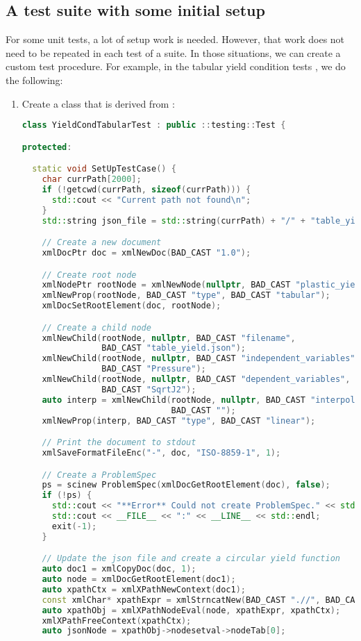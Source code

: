 \subsection{A  test suite with some initial setup}
For some unit tests, a lot of setup work is needed.  However, that work does not
need to be repeated in each test of a suite.  In those situations, we can 
create a custom  test procedure.  For example, in the 
tabular yield condition tests , we do the following:
\begin{enumerate}
  \item Create a class that is derived from :
\begin{lstlisting}[language=Cpp]
class YieldCondTabularTest : public ::testing::Test {

protected:

  static void SetUpTestCase() {
    char currPath[2000];
    if (!getcwd(currPath, sizeof(currPath))) {
      std::cout << "Current path not found\n";
    }
    std::string json_file = std::string(currPath) + "/" + "table_yield.json";

    // Create a new document
    xmlDocPtr doc = xmlNewDoc(BAD_CAST "1.0");

    // Create root node
    xmlNodePtr rootNode = xmlNewNode(nullptr, BAD_CAST "plastic_yield_condition");
    xmlNewProp(rootNode, BAD_CAST "type", BAD_CAST "tabular");
    xmlDocSetRootElement(doc, rootNode);

    // Create a child node
    xmlNewChild(rootNode, nullptr, BAD_CAST "filename", 
                BAD_CAST "table_yield.json");
    xmlNewChild(rootNode, nullptr, BAD_CAST "independent_variables", 
                BAD_CAST "Pressure");
    xmlNewChild(rootNode, nullptr, BAD_CAST "dependent_variables", 
                BAD_CAST "SqrtJ2");
    auto interp = xmlNewChild(rootNode, nullptr, BAD_CAST "interpolation",
                              BAD_CAST "");
    xmlNewProp(interp, BAD_CAST "type", BAD_CAST "linear");

    // Print the document to stdout
    xmlSaveFormatFileEnc("-", doc, "ISO-8859-1", 1);

    // Create a ProblemSpec
    ps = scinew ProblemSpec(xmlDocGetRootElement(doc), false);
    if (!ps) {
      std::cout << "**Error** Could not create ProblemSpec." << std::endl;
      std::cout << __FILE__ << ":" << __LINE__ << std::endl;
      exit(-1);
    }

    // Update the json file and create a circular yield function
    auto doc1 = xmlCopyDoc(doc, 1);
    auto node = xmlDocGetRootElement(doc1);
    auto xpathCtx = xmlXPathNewContext(doc1);
    const xmlChar* xpathExpr = xmlStrncatNew(BAD_CAST ".//", BAD_CAST "filename", -1);
    auto xpathObj = xmlXPathNodeEval(node, xpathExpr, xpathCtx);
    xmlXPathFreeContext(xpathCtx);
    auto jsonNode = xpathObj->nodesetval->nodeTab[0];


\end{lstlisting}
\end{enumerate}
